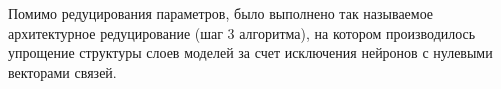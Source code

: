 

Помимо редуцирования параметров, было выполнено так называемое архитектурное редуцирование (шаг 3 алгоритма), на котором производилось упрощение структуры слоев моделей за счет исключения нейронов с нулевыми векторами связей.

